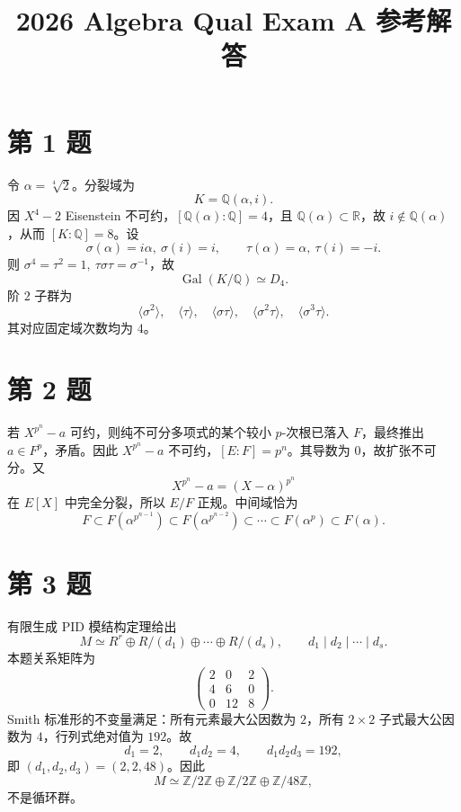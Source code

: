 \documentclass[11pt]{article}
\title{\textbf{2026 Algebra Qual Exam A 参考解答}}
\author{}
\date{}
\begin{document}
\maketitle

\section*{第 1 题}

令 \(\alpha=\sqrt[4]{2}\)。分裂域为
\[
  K=\mathbb Q(\alpha,i).
\]
因 \(X^4-2\) Eisenstein 不可约，\([\mathbb Q(\alpha):\mathbb Q]=4\)，且 \(\mathbb Q(\alpha)\subset \mathbb R\)，故 \(i\notin\mathbb Q(\alpha)\)，从而 \([K:\mathbb Q]=8\)。设
\[
  \sigma(\alpha)=i\alpha,\ \sigma(i)=i,\qquad
  \tau(\alpha)=\alpha,\ \tau(i)=-i.
\]
则 \(\sigma^4=\tau^2=1,\ \tau\sigma\tau=\sigma^{-1}\)，故
\[
  \operatorname{Gal}(K/\mathbb Q)\simeq D_4.
\]
阶 \(2\) 子群为
\[
  \langle\sigma^2\rangle,\quad \langle\tau\rangle,\quad
  \langle\sigma\tau\rangle,\quad
  \langle\sigma^2\tau\rangle,\quad
  \langle\sigma^3\tau\rangle.
\]
其对应固定域次数均为 \(4\)。

\section*{第 2 题}

若 \(X^{p^n}-a\) 可约，则纯不可分多项式的某个较小 \(p\)-次根已落入 \(F\)，最终推出 \(a\in F^p\)，矛盾。因此 \(X^{p^n}-a\) 不可约，\([E:F]=p^n\)。其导数为 \(0\)，故扩张不可分。又
\[
  X^{p^n}-a=(X-\alpha)^{p^n}
\]
在 \(E[X]\) 中完全分裂，所以 \(E/F\) 正规。中间域恰为
\[
  F\subset F(\alpha^{p^{n-1}})\subset F(\alpha^{p^{n-2}})\subset\cdots
  \subset F(\alpha^p)\subset F(\alpha).
\]

\section*{第 3 题}

有限生成 PID 模结构定理给出
\[
  M\simeq R^r\oplus R/(d_1)\oplus\cdots\oplus R/(d_s),
  \qquad d_1\mid d_2\mid\cdots\mid d_s.
\]
本题关系矩阵为
\[
\begin{pmatrix}
2&0&2\\
4&6&0\\
0&12&8
\end{pmatrix}.
\]
Smith 标准形的不变量满足：所有元素最大公因数为 \(2\)，所有 \(2\times2\) 子式最大公因数为 \(4\)，行列式绝对值为 \(192\)。故
\[
  d_1=2,\qquad d_1d_2=4,\qquad d_1d_2d_3=192,
\]
即 \((d_1,d_2,d_3)=(2,2,48)\)。因此
\[
  M\simeq \mathbb Z/2\mathbb Z\oplus \mathbb Z/2\mathbb Z\oplus \mathbb Z/48\mathbb Z,
\]
不是循环群。
\end{document}
